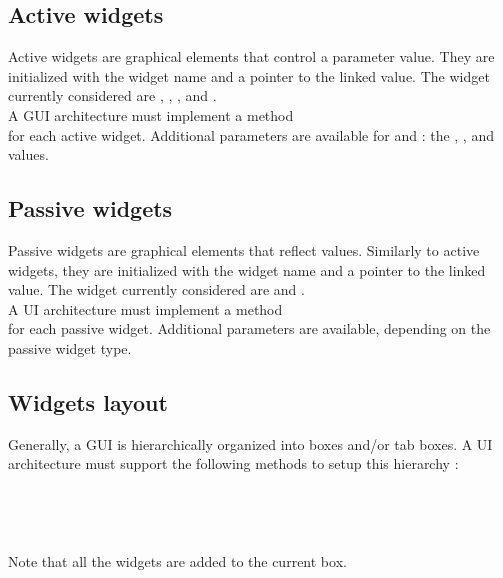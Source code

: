 \subsection{Active widgets}
\label{sec:awidget}
Active widgets are graphical elements that control a parameter value. They are initialized with the widget name and a pointer to the linked value.
The widget currently considered are ,  ,  ,   and  . \\
A GUI architecture must implement a method \\
 for each active widget.
Additional parameters are available for  and : the ,  ,   and  values.

\subsection{Passive widgets}
\label{sec:pwidget}
Passive widgets are graphical elements that reflect values. Similarly to active widgets, they are initialized with the widget name and a pointer to the linked value.
The widget currently considered are   and  . \\
A UI architecture must implement a method \\
 for each passive widget.
Additional parameters are available, depending on the passive widget type.

\subsection{Widgets layout}
\label{sec:wlayout}
Generally, a  GUI is hierarchically organized into boxes and/or tab boxes. 
A UI architecture must support the following methods to setup this hierarchy : \\
\htab{} \\
\htab{} \\
\htab{} \\
\htab{} \\
Note that all the widgets are added to the current box.

